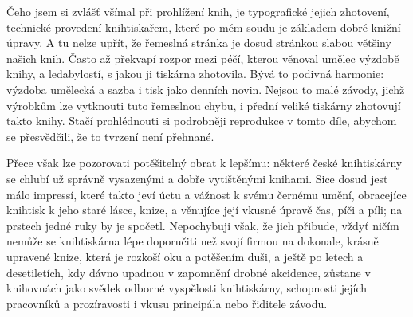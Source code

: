 Čeho jsem si zvlášť všímal při prohlížení knih, je typografické jejich
zhotovení, technické provedení knihtiskařem, které po mém soudu je základem
dobré knižní úpravy. A tu nelze upřít, že řemeslná stránka je dosud stránkou
slabou většiny našich knih. Často až překvapí rozpor mezi péčí, kterou
věnoval umělec výzdobě knihy, a ledabylostí, s jakou ji tiskárna zhotovila.
Bývá to podivná harmonie: výzdoba umělecká a sazba i tisk jako denních
novin. Nejsou to malé závody, jichž výrobkům lze vytknouti tuto řemeslnou
chybu, i přední veliké tiskárny zhotovují takto  knihy. 
Stačí prohlédnouti si podrobněji reprodukce v tomto díle, abychom se
přesvědčili, že to tvrzení není přehnané.

Přece však lze pozorovati potěšitelný obrat k lepšímu: některé české
knihtiskárny se chlubí už správně vysazenými a dobře vytištěnými knihami.
Sice dosud jest málo impressí, které takto jeví úctu a vážnost k svému
černému umění, obracejíce knihtisk k jeho staré lásce, knize, a věnujíce
její vkusné úpravě čas, píči a píli; na prstech jedné ruky by je spočetl.
Nepochybuji však, že jich přibude, vždyť ničím nemůže se knihtiskárna
lépe doporučiti než svojí firmou na dokonale, krásně upravené knize, která
je rozkoší oku a potěšením duši, a ještě po letech a desetiletích, kdy
dávno upadnou v zapomnění drobné akcidence, zůstane v knihovnách jako svědek
odborné vyspělosti knihtiskárny, schopnosti jejích pracovníků
a prozíravosti i vkusu principála nebo řiditele závodu.
